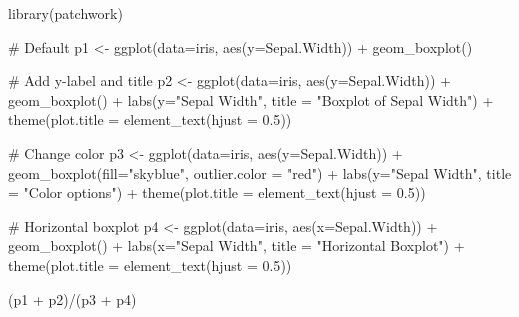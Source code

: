 \documentclass[
  letterpaper,
]{book}
\newenvironment{Shaded}{\begin{snugshade}}{\end{snugshade}}
\newcommand{\AttributeTok}[1]{\textcolor[rgb]{0.40,0.45,0.13}{#1}}
\newcommand{\CommentTok}[1]{\textcolor[rgb]{0.37,0.37,0.37}{#1}}
\newcommand{\FloatTok}[1]{\textcolor[rgb]{0.68,0.00,0.00}{#1}}
\newcommand{\FunctionTok}[1]{\textcolor[rgb]{0.28,0.35,0.67}{#1}}
\newcommand{\NormalTok}[1]{\textcolor[rgb]{0.00,0.23,0.31}{#1}}
\newcommand{\OtherTok}[1]{\textcolor[rgb]{0.00,0.23,0.31}{#1}}
\newcommand{\SpecialCharTok}[1]{\textcolor[rgb]{0.37,0.37,0.37}{#1}}
\newcommand{\StringTok}[1]{\textcolor[rgb]{0.13,0.47,0.30}{#1}}
\begin{document}
\begin{Shaded}
\begin{Highlighting}[]
\FunctionTok{library}\NormalTok{(patchwork)}

\CommentTok{\# Default}
\NormalTok{p1 }\OtherTok{\textless{}{-}} \FunctionTok{ggplot}\NormalTok{(}\AttributeTok{data=}\NormalTok{iris, }\FunctionTok{aes}\NormalTok{(}\AttributeTok{y=}\NormalTok{Sepal.Width)) }\SpecialCharTok{+}
        \FunctionTok{geom\_boxplot}\NormalTok{()}

\CommentTok{\# Add y{-}label and title}
\NormalTok{p2 }\OtherTok{\textless{}{-}} \FunctionTok{ggplot}\NormalTok{(}\AttributeTok{data=}\NormalTok{iris, }\FunctionTok{aes}\NormalTok{(}\AttributeTok{y=}\NormalTok{Sepal.Width)) }\SpecialCharTok{+}
        \FunctionTok{geom\_boxplot}\NormalTok{() }\SpecialCharTok{+}
        \FunctionTok{labs}\NormalTok{(}\AttributeTok{y=}\StringTok{"Sepal Width"}\NormalTok{, }\AttributeTok{title =} \StringTok{"Boxplot of Sepal Width"}\NormalTok{) }\SpecialCharTok{+}
        \FunctionTok{theme}\NormalTok{(}\AttributeTok{plot.title =} \FunctionTok{element\_text}\NormalTok{(}\AttributeTok{hjust =} \FloatTok{0.5}\NormalTok{))}

\CommentTok{\# Change color}
\NormalTok{p3 }\OtherTok{\textless{}{-}} \FunctionTok{ggplot}\NormalTok{(}\AttributeTok{data=}\NormalTok{iris, }\FunctionTok{aes}\NormalTok{(}\AttributeTok{y=}\NormalTok{Sepal.Width)) }\SpecialCharTok{+}
        \FunctionTok{geom\_boxplot}\NormalTok{(}\AttributeTok{fill=}\StringTok{"skyblue"}\NormalTok{, }\AttributeTok{outlier.color =} \StringTok{"red"}\NormalTok{) }\SpecialCharTok{+}
        \FunctionTok{labs}\NormalTok{(}\AttributeTok{y=}\StringTok{"Sepal Width"}\NormalTok{, }\AttributeTok{title =} \StringTok{"Color options"}\NormalTok{) }\SpecialCharTok{+}
        \FunctionTok{theme}\NormalTok{(}\AttributeTok{plot.title =} \FunctionTok{element\_text}\NormalTok{(}\AttributeTok{hjust =} \FloatTok{0.5}\NormalTok{))}

\CommentTok{\# Horizontal boxplot}
\NormalTok{p4 }\OtherTok{\textless{}{-}} \FunctionTok{ggplot}\NormalTok{(}\AttributeTok{data=}\NormalTok{iris, }\FunctionTok{aes}\NormalTok{(}\AttributeTok{x=}\NormalTok{Sepal.Width)) }\SpecialCharTok{+}
        \FunctionTok{geom\_boxplot}\NormalTok{() }\SpecialCharTok{+}
        \FunctionTok{labs}\NormalTok{(}\AttributeTok{x=}\StringTok{"Sepal Width"}\NormalTok{, }\AttributeTok{title =} \StringTok{"Horizontal Boxplot"}\NormalTok{) }\SpecialCharTok{+}
        \FunctionTok{theme}\NormalTok{(}\AttributeTok{plot.title =} \FunctionTok{element\_text}\NormalTok{(}\AttributeTok{hjust =} \FloatTok{0.5}\NormalTok{))}

\NormalTok{(p1 }\SpecialCharTok{+}\NormalTok{ p2)}\SpecialCharTok{/}\NormalTok{(p3 }\SpecialCharTok{+}\NormalTok{ p4)}
\end{Highlighting}
\end{Shaded}
\end{document}
